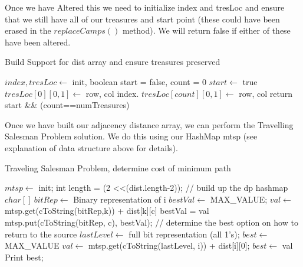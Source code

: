 \documentclass[12pt]{article}
\begin{document}
Once we have Altered this we need to initialize index and tresLoc and ensure that we still
have all of our treasures and start point (these could have been erased in the $replaceCamps()$
method). We will return false if either of these have been altered.

\begin{algorithm}[H]
\caption{Build Support for dist array and ensure treasures preserved}
\begin{algorithmic}
        \State $index, tresLoc \gets$ init, boolean start = false, count = 0
                \State $start \gets$ true
                \State $tresLoc[0][0,1] \gets$ row, col
                \State index.
                \State $tresLoc[count][0,1] \gets$ row, col
            \EndIf
        \EndFor
        \State return start \&\& (count==numTreasures)
    \EndProcedure
\end{algorithmic}
\end{algorithm}

Once we have built our adjacency distance array, we can perform the Travelling Salesman Problem
solution. We do this using our HashMap mtsp  (see explanation of data structure above for details).

\begin{algorithm}[H]
\caption{Traveling Salesman Problem, determine cost of minimum path}
\begin{algorithmic}
        \State $mtsp \gets$ init; int length = (2 \textless\textless (dist.length-2));
        \State // build up the dp hashmap
            \State $char[ ]\ bitRep \gets$ Binary representation of i
                    \State $bestVal \gets$ MAX\_VALUE;
                            \State $val \gets$ mtsp.get(cToString(bitRep,k)) + dist[k][c]
                                bestVal = val
                            \EndIf
                        \EndIf
                    \EndFor
                    \State mtsp.put(cToString(bitRep, c), bestVal);
                \EndIf
            \EndFor
        \EndFor
        \State // determine the best option on how to return to the source
        \State $lastLevel \gets$ full bit representation (all 1's); $best \gets$ MAX\_VALUE
            \State $val \gets$ mtsp.get(cToString(lastLevel, i)) + dist[i][0];
                $best \gets$ val
            \EndIf
        \EndFor
        \State Print best;
    \EndProcedure
\end{algorithmic}
\end{algorithm}
\end{document}
